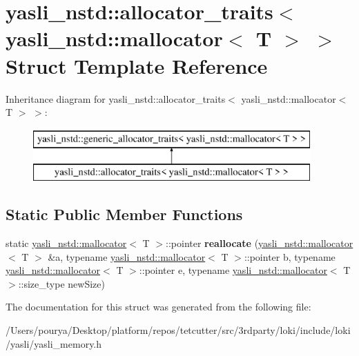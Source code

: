 \hypertarget{structyasli__nstd_1_1allocator__traits_3_01yasli__nstd_1_1mallocator_3_01T_01_4_01_4}{}\section{yasli\+\_\+nstd\+:\+:allocator\+\_\+traits$<$ yasli\+\_\+nstd\+:\+:mallocator$<$ T $>$ $>$ Struct Template Reference}
\label{structyasli__nstd_1_1allocator__traits_3_01yasli__nstd_1_1mallocator_3_01T_01_4_01_4}
Inheritance diagram for yasli\+\_\+nstd\+:\+:allocator\+\_\+traits$<$ yasli\+\_\+nstd\+:\+:mallocator$<$ T $>$ $>$\+:\begin{figure}[H]
\begin{center}
\leavevmode
\includegraphics[height=2.000000cm]{structyasli__nstd_1_1allocator__traits_3_01yasli__nstd_1_1mallocator_3_01T_01_4_01_4}
\end{center}
\end{figure}
\subsection*{Static Public Member Functions}
\begin{DoxyCompactItemize}
\item 
\hypertarget{structyasli__nstd_1_1allocator__traits_3_01yasli__nstd_1_1mallocator_3_01T_01_4_01_4_a7dc60ef3020bafe7a5678ce744c0c8df}{}static \hyperlink{classyasli__nstd_1_1mallocator}{yasli\+\_\+nstd\+::mallocator}$<$ T $>$\+::pointer {\bfseries reallocate} (\hyperlink{classyasli__nstd_1_1mallocator}{yasli\+\_\+nstd\+::mallocator}$<$ T $>$ \&a, typename \hyperlink{classyasli__nstd_1_1mallocator}{yasli\+\_\+nstd\+::mallocator}$<$ T $>$\+::pointer b, typename \hyperlink{classyasli__nstd_1_1mallocator}{yasli\+\_\+nstd\+::mallocator}$<$ T $>$\+::pointer e, typename \hyperlink{classyasli__nstd_1_1mallocator}{yasli\+\_\+nstd\+::mallocator}$<$ T $>$\+::size\+\_\+type new\+Size)\label{structyasli__nstd_1_1allocator__traits_3_01yasli__nstd_1_1mallocator_3_01T_01_4_01_4_a7dc60ef3020bafe7a5678ce744c0c8df}

\end{DoxyCompactItemize}


The documentation for this struct was generated from the following file\+:\begin{DoxyCompactItemize}
\item 
/\+Users/pourya/\+Desktop/platform/repos/tetcutter/src/3rdparty/loki/include/loki/yasli/yasli\+\_\+memory.\+h\end{DoxyCompactItemize}
